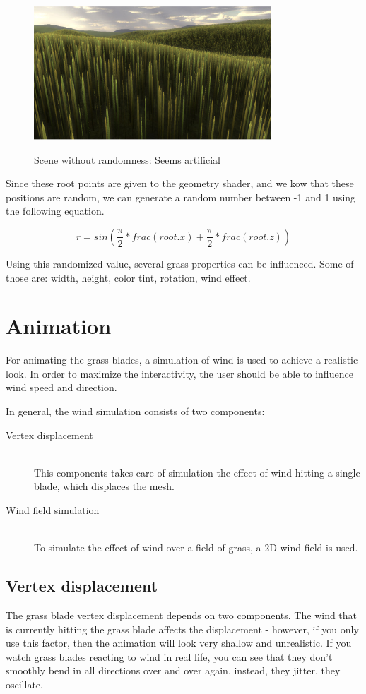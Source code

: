 \documentclass[conference]{acmsiggraph}
\begin{document}
 \begin{figure}[ht]
   \centering
   \includegraphics[width=3.5in]{images/no_randomness}
   \caption{Scene without randomness: Seems artificial} \cite{EddieLee}
 \end{figure}

Since these root points are given to the geometry shader, and we kow that these positions are random, we can generate a random number between -1 and 1 using the following equation.

\begin{equation}
r = sin(\frac{\pi}2 * frac(root.x) + \frac{\pi}2 * frac(root.z))
\end{equation}

Using this randomized value, several grass properties can be influenced. Some of those are: width, height, color tint, rotation, wind effect.

\section{Animation}
For animating the grass blades, a simulation of wind is used to achieve a realistic look. In order to maximize the interactivity, the user should be able to influence wind speed and direction. 

In general, the wind simulation consists of two components:

\begin{description}
  \item[Vertex displacement] \hfill \\
  This components takes care of simulation the effect of wind hitting a single blade, which displaces the mesh.
  \item[Wind field simulation] \hfill \\
  To simulate the effect of wind over a field of grass, a 2D wind field is used.
\end{description}

\subsection{Vertex displacement}
The grass blade vertex displacement depends on two components. The wind that is currently hitting the grass blade affects the displacement - however, if you only use this factor, then the animation will look very shallow and unrealistic. If you watch grass blades reacting to wind in real life, you can see that they don't smoothly bend in all directions over and over again, instead, they jitter, they oscillate.
\end{document}
